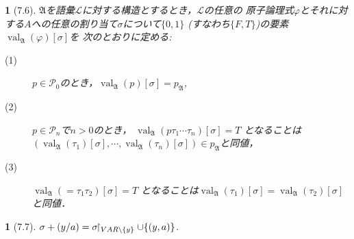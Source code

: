 \documentclass[a4j,10.5pt,oneside,openany]{jsbook}
\theoremstyle{mystyle}
\newtheorem{dfn}[thm]{\color{PakistanGreen}{定義}}
\newcommand{\val}{\operatorname{val}} %
\newcommand{\rest}[2]{#1\hspace{-0.41em}\upharpoonright_{#2}} %
\begin{document}
	\begin{screen}
		\begin{dfn}[7.6]
			$\mathfrak{A}$を語彙$\mathcal{L}$に対する構造とするとき，$\mathcal{L}$の任意の
			原子論理式$\varphi$とそれに対する$A$への任意の割り当て$\sigma$について$\{0,1\}$
			(すなわち$\{F,T\}$)の要素$\val_{\mathfrak{A}}(\varphi)[\sigma]$を
			次のとおりに定める:
			\begin{description}
				\item[(1)] $p \in \mathcal{P}_{0}$のとき，$\val_{\mathfrak{A}}(p)[\sigma] = p_{\mathfrak{A}}$,
				\item[(2)] $p \in \mathcal{P}_{n}$で$n > 0$のとき，
					$\val_{\mathfrak{A}}(p\tau_{1}\cdots\tau_{n})[\sigma] = T$
					となることは$\left(\val_{\mathfrak{A}}(\tau_{1})[\sigma],
					\cdots,\val_{\mathfrak{A}}(\tau_{n})[\sigma]\right) \in p_{\mathfrak{A}}$と同値，
				\item[(3)] $\val_{\mathfrak{A}}(=\tau_{1}\tau_{2})[\sigma] = T$
					となることは$\val_{\mathfrak{A}}(\tau_{1})[\sigma] = 
					\val_{\mathfrak{A}}(\tau_{2})[\sigma]$と同値．
			\end{description}
		\end{dfn}
	\end{screen}
	
	\begin{screen}
		\begin{dfn}[7.7]
			$\sigma + (y/a) = \rest{\sigma}{VAR \backslash \{y\}} \cup \{(y,a)\}$.
		\end{dfn}
	\end{screen}
	
\end{document}
